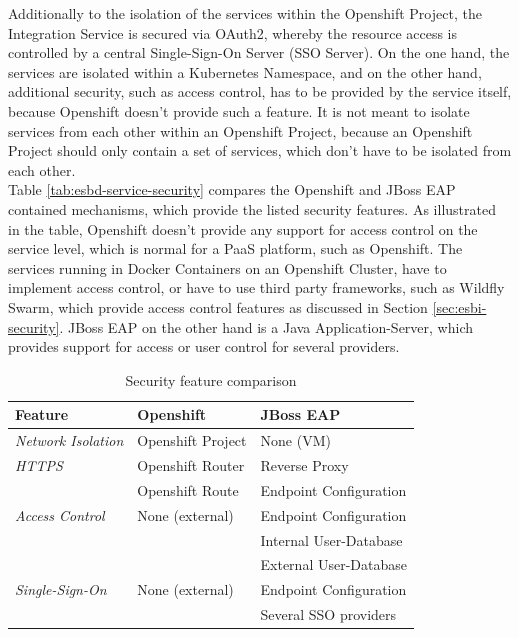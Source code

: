 Additionally to the isolation of the services within the Openshift Project, the Integration Service is secured via OAuth2, whereby the resource access is controlled by a central Single-Sign-On Server (SSO Server). On the one hand, the services are isolated within a Kubernetes Namespace, and on the other hand, additional security, such as access control, has to be provided by the service itself, because Openshift doesn't provide such a feature. It is not meant to isolate services from each other within an Openshift Project, because an Openshift Project should only contain a set of services, which don't have to be isolated from each other. \\

Table \vref{tab:esbd-service-security} compares the Openshift and JBoss EAP contained mechanisms, which provide the listed security features. As illustrated in the table, Openshift doesn't provide any support for access control on the service level, which is normal for a PaaS platform, such as Openshift. The services running in Docker Containers on an Openshift Cluster, have to implement access control, or have to use third party frameworks, such as Wildfly Swarm, which provide access control features as discussed in Section \vref{sec:esbi-security}. JBoss EAP on the other hand is a Java Application-Server, which provides support for access or user control for several providers. 

{\renewcommand{\arraystretch}{1.2}%
	\begin{table}[h]
		\begin{tabularx}{\textwidth}{ X|X|X }	
			\textbf{Feature}                 & \textbf{Openshift}      & \textbf{JBoss EAP} \\  \hline
			\textit{Network Isolation}       & Openshift Project       & None (VM) \\  \hline
			\textit{HTTPS}                   & Openshift Router        & Reverse Proxy \\
			                                 & Openshift Route         & Endpoint Configuration \\  \hline
            \textit{Access Control}          & None (external)         & Endpoint Configuration \\
                                                                      && Internal User-Database \\ 
                                                                      && External User-Database \\  \hline
            \textit{Single-Sign-On}          & None (external)         & Endpoint Configuration \\
                                                                      && Several SSO providers \\  \hline
		\end{tabularx}
		\caption{Security feature comparison}
		\label{tab:esbd-service-security}
\end{table}}


